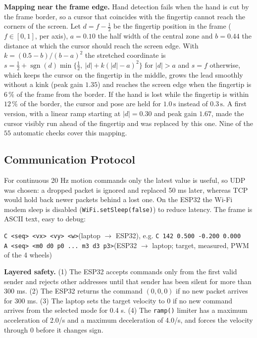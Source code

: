\documentclass[11pt,a4paper]{article}
\newcommand{\code}[1]{\texttt{\small #1}}
\begin{document}
\textbf{Mapping near the frame edge.}\label{sec:edge} Hand detection fails when the hand is cut by the frame border, so a cursor that coincides with the fingertip cannot reach the corners of the screen. Let $d=f-\tfrac12$ be the fingertip position in the frame ($f\in[0,1]$, per axis), $a=0.10$ the half width of the central zone and $b=0.44$ the distance at which the cursor should reach the screen edge. With $k=(0.5-b)/(b-a)^2$ the stretched coordinate is $s=\tfrac12+\operatorname{sgn}(d)\min\{\tfrac12,\ |d|+k(|d|-a)^2\}$ for $|d|>a$ and $s=f$ otherwise, which keeps the cursor on the fingertip in the middle, grows the lead smoothly without a kink (peak gain $1.35$) and reaches the screen edge when the fingertip is $6\,\%$ of the frame from the border. If the hand is lost while the fingertip is within $12\,\%$ of the border, the cursor and pose are held for $1.0\,\mathrm{s}$ instead of $0.3\,\mathrm{s}$. A first version, with a linear ramp starting at $|d|=0.30$ and peak gain $1.67$, made the cursor visibly run ahead of the fingertip and was replaced by this one. Nine of the $55$ automatic checks cover this mapping.

\subsection{Communication Protocol}
For continuous 20 Hz motion commands only the latest value is useful, so UDP was chosen: a dropped packet is ignored and replaced 50 ms later, whereas TCP would hold back newer packets behind a lost one. On the ESP32 the Wi-Fi modem sleep is disabled (\code{WiFi.setSleep(false)}) to reduce latency. The frame is ASCII text, easy to debug:
\begin{center}\small
\code{C <seq> <vx> <vy> <w>}\quad (laptop $\to$ ESP32), e.g. \code{C 142 0.500 -0.200 0.000}\\
\code{A <seq> <m0 d0 p0 ... m3 d3 p3>}\quad (ESP32 $\to$ laptop; target, measured, PWM of the 4 wheels)
\end{center}
\textbf{Layered safety.} (1) The ESP32 accepts commands only from the first valid sender and rejects other addresses until that sender has been silent for more than 300 ms. (2) The ESP32 returns the command $(0,0,0)$ if no new packet arrives for 300 ms. (3) The laptop sets the target velocity to 0 if no new command arrives from the selected mode for 0.4 s. (4) The \code{ramp()} limiter has a maximum acceleration of 2.0/s and a maximum deceleration of 4.0/s, and forces the velocity through 0 before it changes sign.
\end{document}
